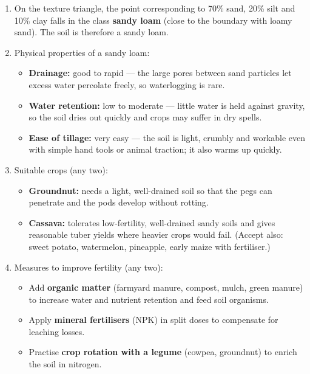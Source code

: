 \documentclass[11pt]{article}
\begin{document}
\begin{corrige}
\begin{enumerate}
\item On the texture triangle, the point corresponding to 70\% sand, 20\% silt and 10\% clay falls in the class \textbf{sandy loam} (close to the boundary with loamy sand). The soil is therefore a sandy loam.
\item Physical properties of a sandy loam:
\begin{itemize}
\item \textbf{Drainage:} good to rapid — the large pores between sand particles let excess water percolate freely, so waterlogging is rare.
\item \textbf{Water retention:} low to moderate — little water is held against gravity, so the soil dries out quickly and crops may suffer in dry spells.
\item \textbf{Ease of tillage:} very easy — the soil is light, crumbly and workable even with simple hand tools or animal traction; it also warms up quickly.
\end{itemize}
\item Suitable crops (any two):
\begin{itemize}
\item \textbf{Groundnut:} needs a light, well-drained soil so that the pegs can penetrate and the pods develop without rotting.
\item \textbf{Cassava:} tolerates low-fertility, well-drained sandy soils and gives reasonable tuber yields where heavier crops would fail. (Accept also: sweet potato, watermelon, pineapple, early maize with fertiliser.)
\end{itemize}
\item Measures to improve fertility (any two):
\begin{itemize}
\item Add \textbf{organic matter} (farmyard manure, compost, mulch, green manure) to increase water and nutrient retention and feed soil organisms.
\item Apply \textbf{mineral fertilisers} (NPK) in split doses to compensate for leaching losses.
\item Practise \textbf{crop rotation with a legume} (cowpea, groundnut) to enrich the soil in nitrogen.
\end{itemize}
\end{enumerate}
\end{corrige}
\end{document}
